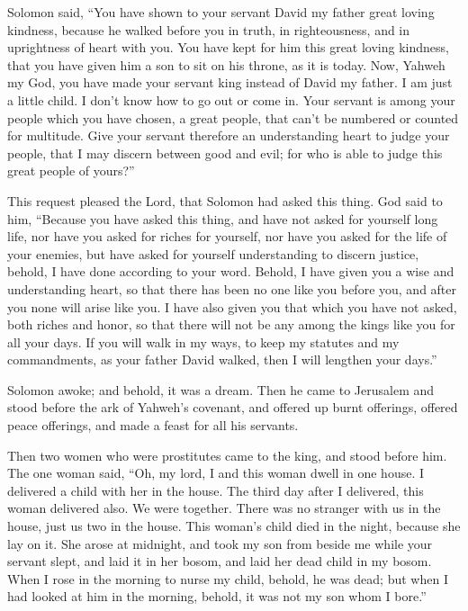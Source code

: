 Solomon said, ``You have shown to your servant David my
father great loving kindness, because he walked before you in truth, in
righteousness, and in uprightness of heart with you. You have kept for
him this great loving kindness, that you have given him a son to sit on
his throne, as it is today.  Now, Yahweh my God, you have
made your servant king instead of David my father. I am just a little
child. I don't know how to go out or come in.  Your
servant is among your people which you have chosen, a great people, that
can't be numbered or counted for multitude.  Give your
servant therefore an understanding heart to judge your people, that I
may discern between good and evil; for who is able to judge this great
people of yours?''

 This request pleased the Lord, that Solomon had asked
this thing.  God said to him, ``Because you have asked
this thing, and have not asked for yourself long life, nor have you
asked for riches for yourself, nor have you asked for the life of your
enemies, but have asked for yourself understanding to discern justice,
 behold, I have done according to your word. Behold, I
have given you a wise and understanding heart, so that there has been no
one like you before you, and after you none will arise like you.
 I have also given you that which you have not asked,
both riches and honor, so that there will not be any among the kings
like you for all your days.  If you will walk in my ways,
to keep my statutes and my commandments, as your father David walked,
then I will lengthen your days.''

 Solomon awoke; and behold, it was a dream. Then he came
to Jerusalem and stood before the ark of Yahweh's covenant, and offered
up burnt offerings, offered peace offerings, and made a feast for all
his servants.

 Then two women who were prostitutes came to the king,
and stood before him.  The one woman said, ``Oh, my lord,
I and this woman dwell in one house. I delivered a child with her in the
house.  The third day after I delivered, this woman
delivered also. We were together. There was no stranger with us in the
house, just us two in the house.  This woman's child died
in the night, because she lay on it.  She arose at
midnight, and took my son from beside me while your servant slept, and
laid it in her bosom, and laid her dead child in my bosom.
 When I rose in the morning to nurse my child, behold, he
was dead; but when I had looked at him in the morning, behold, it was
not my son whom I bore.''

